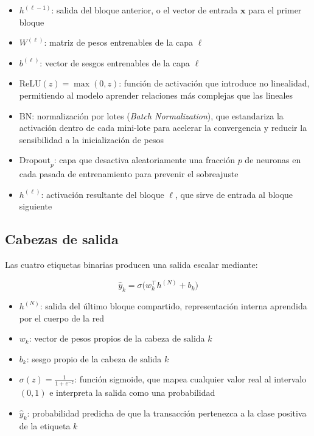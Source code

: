 \documentclass[12pt, a4paper]{report}
\begin{document}
\begin{itemize}
  \item $h^{(\ell-1)}$: salida del bloque anterior, o el vector de entrada $\mathbf{x}$ para el primer bloque
  \item $W^{(\ell)}$: matriz de pesos entrenables de la capa $\ell$
  \item $b^{(\ell)}$: vector de sesgos entrenables de la capa $\ell$
  \item $\text{ReLU}(z) = \max(0,z)$: función de activación que introduce no linealidad, permitiendo al modelo aprender relaciones más complejas que las lineales
  \item $\text{BN}$: normalización por lotes (\textit{Batch Normalization}), que estandariza la activación dentro de cada mini-lote para acelerar la convergencia y reducir la sensibilidad a la inicialización de pesos
  \item $\text{Dropout}_p$: capa que desactiva aleatoriamente una fracción $p$ de neuronas en cada pasada de entrenamiento para prevenir el sobreajuste
  \item $h^{(\ell)}$: activación resultante del bloque $\ell$, que sirve de entrada al bloque siguiente
\end{itemize}

\subsection{Cabezas de salida}

Las cuatro etiquetas binarias producen una salida escalar mediante:

\[
  \hat{y}_k = \sigma\!\bigl(w_k^\top h^{(N)} + b_k\bigr)
\]

\begin{itemize}
  \item $h^{(N)}$: salida del último bloque compartido, representación interna aprendida por el cuerpo de la red
  \item $w_k$: vector de pesos propios de la cabeza de salida $k$
  \item $b_k$: sesgo propio de la cabeza de salida $k$
  \item $\sigma(z) = \tfrac{1}{1+e^{-z}}$: función sigmoide, que mapea cualquier valor real al intervalo $(0,1)$ e interpreta la salida como una probabilidad
  \item $\hat{y}_k$: probabilidad predicha de que la transacción pertenezca a la clase positiva de la etiqueta $k$
\end{itemize}
\end{document}
